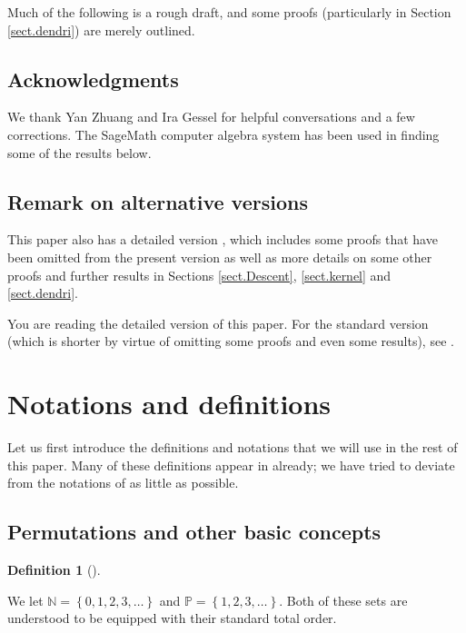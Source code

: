\documentclass[numbers=enddot,12pt,final,onecolumn,notitlepage]{scrartcl}%
\theoremstyle{definition}
\newtheorem{defi}[theo]{Definition}
\newenvironment{definition}[1][]
{\begin{defi}[#1]\begin{leftbar}}
{\end{leftbar}\end{defi}}
\newenvironment{verlong}{}{}
\newenvironment{vershort}{}{}
\newenvironment{noncompile}{}{}
\begin{document}
\begin{noncompile}
Much of the following is a rough draft, and some proofs (particularly in
Section \ref{sect.dendri}) are merely outlined.
\end{noncompile}

\subsection*{Acknowledgments}

We thank Yan Zhuang and Ira Gessel for helpful conversations and a few
corrections. The SageMath computer algebra system \cite{SageMath} has been
used in finding some of the results below.

\subsection{Remark on alternative versions}

\begin{vershort}
This paper also has a detailed version \cite{verlong}, which includes some
proofs that have been omitted from the present version as well as more details
on some other proofs and further results in Sections \ref{sect.Descent},
\ref{sect.kernel} and \ref{sect.dendri}.
\end{vershort}

\begin{verlong}
You are reading the detailed version of this paper. For the standard version
(which is shorter by virtue of omitting some proofs and even some results),
see \cite{vershort}.
\end{verlong}

\section{\label{sect.notations}Notations and definitions}

Let us first introduce the definitions and notations that we will use in the
rest of this paper. Many of these definitions appear in \cite{part1} already;
we have tried to deviate from the notations of \cite{part1} as little as possible.

\subsection{Permutations and other basic concepts}

\begin{definition}
We let $\mathbb{N}=\left\{  0,1,2,3,\ldots\right\}  $ and $\mathbb{P}=\left\{
1,2,3,\ldots\right\}  $. Both of these sets are understood to be equipped with
their standard total order.
\end{definition}
\end{document}
